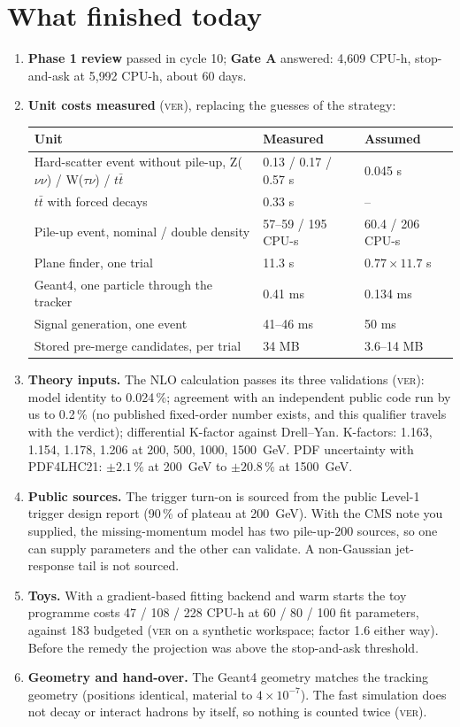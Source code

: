 \documentclass[11pt,a4paper]{article}
\newcommand{\ver}{\textsc{ver}}
\begin{document}
\section{What finished today}
\begin{enumerate}
\item \textbf{Phase 1 review} passed in cycle 10; \textbf{Gate A} answered: 4{,}609 CPU-h, stop-and-ask at
      5{,}992 CPU-h, about 60 days.
\item \textbf{Unit costs measured} (\ver), replacing the guesses of the strategy:
\begin{center}
\begin{tabular}{L{7.4cm}L{3.2cm}L{3.2cm}}
\toprule
Unit & Measured & Assumed \\
\midrule
Hard-scatter event without pile-up, Z($\nu\nu$) / W($\tau\nu$) / $t\bar t$ & 0.13 / 0.17 / 0.57 s & 0.045 s \\
$t\bar t$ with forced decays & 0.33 s & -- \\
Pile-up event, nominal / double density & 57--59 / 195 CPU-s & 60.4 / 206 CPU-s \\
Plane finder, one trial & 11.3 s & $0.77\times11.7$ s \\
Geant4, one particle through the tracker & 0.41 ms & 0.134 ms \\
Signal generation, one event & 41--46 ms & 50 ms \\
Stored pre-merge candidates, per trial & 34 MB & 3.6--14 MB \\
\bottomrule
\end{tabular}
\end{center}
\item \textbf{Theory inputs.} The NLO calculation passes its three validations (\ver): model identity to
      0.024\,\%; agreement with an independent public code run by us to 0.2\,\% (no published fixed-order number
      exists, and this qualifier travels with the verdict); differential K-factor against Drell--Yan. K-factors:
      1.163, 1.154, 1.178, 1.206 at 200, 500, 1000, 1500~GeV. PDF uncertainty with PDF4LHC21: $\pm2.1\,\%$ at
      200~GeV to $\pm20.8\,\%$ at 1500~GeV.
\item \textbf{Public sources.} The trigger turn-on is sourced from the public Level-1 trigger design report (90\,\%
      of plateau at 200~GeV). With the CMS note you supplied, the missing-momentum model has two pile-up-200
      sources, so one can supply parameters and the other can validate. A non-Gaussian jet-response tail is not
      sourced.
\item \textbf{Toys.} With a gradient-based fitting backend and warm starts the toy programme costs 47 / 108 / 228
      CPU-h at 60 / 80 / 100 fit parameters, against 183 budgeted (\ver{} on a synthetic workspace; factor 1.6
      either way). Before the remedy the projection was above the stop-and-ask threshold.
\item \textbf{Geometry and hand-over.} The Geant4 geometry matches the tracking geometry (positions identical,
      material to $4\times10^{-7}$). The fast simulation does not decay or interact hadrons by itself, so nothing
      is counted twice (\ver).
\end{enumerate}
\end{document}

